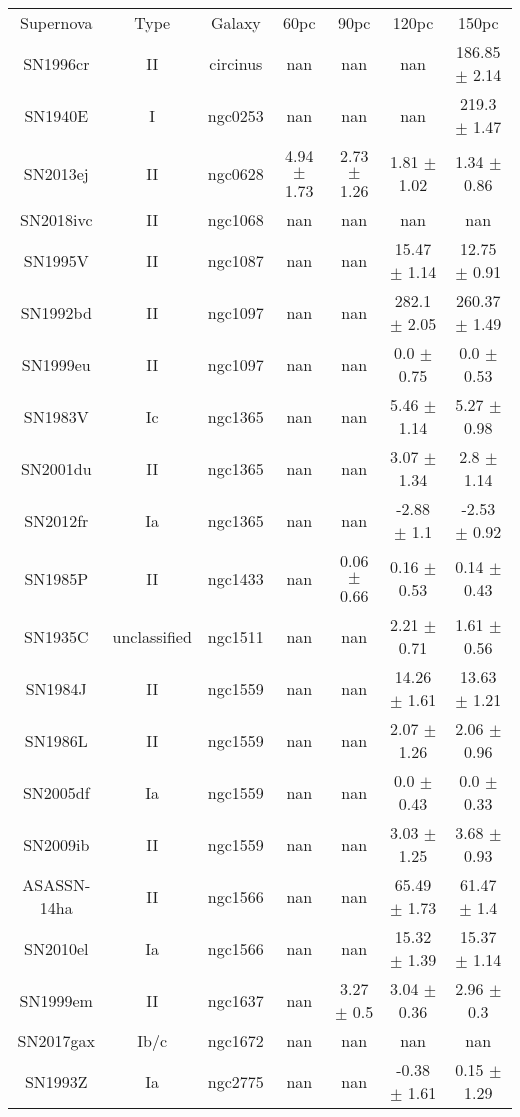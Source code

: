 \begin{table}
\begin{tabular}{ccccccc}
Supernova & Type & Galaxy & 60pc & 90pc & 120pc & 150pc \\
SN1996cr & II & circinus & nan & nan & nan & 186.85 $\pm$ 2.14 \\
SN1940E & I & ngc0253 & nan & nan & nan & 219.3 $\pm$ 1.47 \\
SN2013ej & II & ngc0628 & 4.94 $\pm$ 1.73 & 2.73 $\pm$ 1.26 & 1.81 $\pm$ 1.02 & 1.34 $\pm$ 0.86 \\
SN2018ivc & II & ngc1068 & nan & nan & nan & nan \\
SN1995V & II & ngc1087 & nan & nan & 15.47 $\pm$ 1.14 & 12.75 $\pm$ 0.91 \\
SN1992bd & II & ngc1097 & nan & nan & 282.1 $\pm$ 2.05 & 260.37 $\pm$ 1.49 \\
SN1999eu & II & ngc1097 & nan & nan & 0.0 $\pm$ 0.75 & 0.0 $\pm$ 0.53 \\
SN1983V & Ic & ngc1365 & nan & nan & 5.46 $\pm$ 1.14 & 5.27 $\pm$ 0.98 \\
SN2001du & II & ngc1365 & nan & nan & 3.07 $\pm$ 1.34 & 2.8 $\pm$ 1.14 \\
SN2012fr & Ia & ngc1365 & nan & nan & -2.88 $\pm$ 1.1 & -2.53 $\pm$ 0.92 \\
SN1985P & II & ngc1433 & nan & 0.06 $\pm$ 0.66 & 0.16 $\pm$ 0.53 & 0.14 $\pm$ 0.43 \\
SN1935C & unclassified & ngc1511 & nan & nan & 2.21 $\pm$ 0.71 & 1.61 $\pm$ 0.56 \\
SN1984J & II & ngc1559 & nan & nan & 14.26 $\pm$ 1.61 & 13.63 $\pm$ 1.21 \\
SN1986L & II & ngc1559 & nan & nan & 2.07 $\pm$ 1.26 & 2.06 $\pm$ 0.96 \\
SN2005df & Ia & ngc1559 & nan & nan & 0.0 $\pm$ 0.43 & 0.0 $\pm$ 0.33 \\
SN2009ib & II & ngc1559 & nan & nan & 3.03 $\pm$ 1.25 & 3.68 $\pm$ 0.93 \\
ASASSN-14ha & II & ngc1566 & nan & nan & 65.49 $\pm$ 1.73 & 61.47 $\pm$ 1.4 \\
SN2010el & Ia & ngc1566 & nan & nan & 15.32 $\pm$ 1.39 & 15.37 $\pm$ 1.14 \\
SN1999em & II & ngc1637 & nan & 3.27 $\pm$ 0.5 & 3.04 $\pm$ 0.36 & 2.96 $\pm$ 0.3 \\
SN2017gax & Ib/c & ngc1672 & nan & nan & nan & nan \\
SN1993Z & Ia & ngc2775 & nan & nan & -0.38 $\pm$ 1.61 & 0.15 $\pm$ 1.29 \\

\end{tabular}
\end{table}
